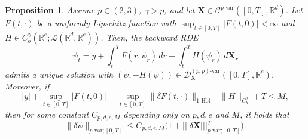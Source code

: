 \documentclass[11pt,reqno]{amsart}
\newtheorem{proposition}[lemma]{Proposition}
\numberwithin{equation}{section}
\def\R{\mathbb R}
\newcommand{\triplenorm}[1]{%
\left|\!\left|\!\left|#1\right|\!\right|\!\right|%
}
\begin{document}
\begin{proposition}\label{prop:RDE with drift}
Assume $p\in(2,3)$, $\gamma>p$, and let
$\mathbf X\in\mathscr C^{p\text{-}\mathrm{var}}([0,T],\R^d)$. Let $F(t,\cdot)$ be a uniformly Lipschitz function with $\sup_{t \in [0,T]}|F(t,0)| < \infty$ and $H \in C_b^{\gamma}(\R^e;\mathscr L(\R^d,\R^e))$.
Then, the backward RDE
\begin{equation}\label{e:backward RDE}
\psi_t
=
y+\int_t^T F(r,\psi_r)\,dr
+
\int_t^T H(\psi_r)\,d\mathbf X_r
\end{equation}
admits a unique solution with
$(\psi,-H(\psi))\in\mathscr D_{\mathrm X}^{(p,p)\text{-}\mathrm{var}}([0,T],\R^e)$.
Moreover, if
\[
|y|
+
\sup_{t\in[0,T]}|F(t,0)|
+
\sup_{t\in[0,T]}
\|\delta F(t,\bm\cdot)\|_{1\text{-}\mathrm{H\ddot{o}l}}
+
\|H\|_{C_b^{2}} + T
\le M,
\]
then for some constant $C_{p,d,e,M}$ depending only on $p,d,e$ and $M$, it holds that 
\begin{equation}\label{e:estimate for RDEs}
\|\delta \psi\|_{p\text{-}\mathrm{var};[0,T]} 
\le
C_{p,d,e,M} 
\Big(
1+
\triplenorm{\delta \mathbf X}_{p\text{-}\mathrm{var};[0,T]}^{\,p}
\Big).
\end{equation}
\end{proposition}
\end{document}

